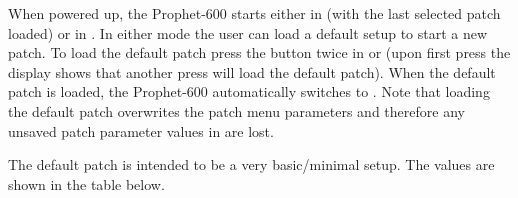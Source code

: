 When powered up, the Prophet-600 starts either in \presetmode (with the last selected patch loaded) or in \livemode. In either mode the user can load a default setup to start a new patch. To load the default patch press the \preset button twice in \shiftmode or \shiftlock (upon first press the display shows that another press will load the default patch). When the default patch is loaded, the Prophet-600 automatically switches to \presetpanel. Note that loading  the default patch overwrites the patch menu parameters and therefore any unsaved patch parameter values in \presetmode are lost.

The default patch is intended to be a very basic/minimal setup. The values are shown in the table below.

\footnotesize
\renewcommand{\arraystretch}{1.3}

